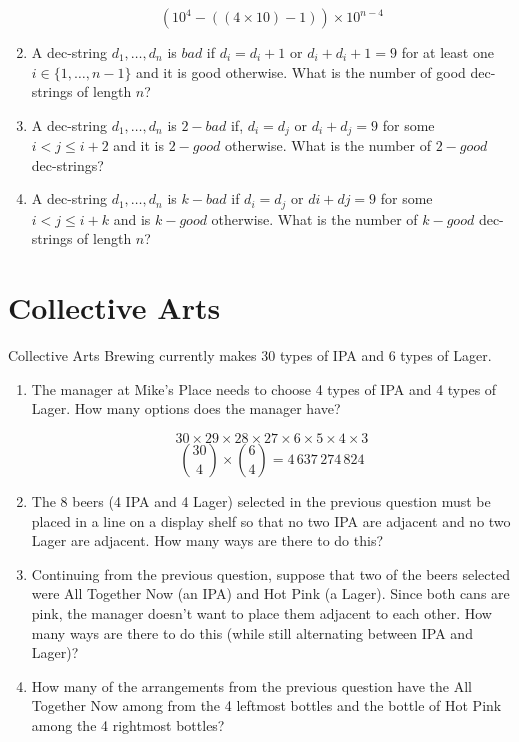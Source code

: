 \documentclass{article}
\begin{document}
\begin{enumerate}
   \[
      (10^4 - ((4 \times 10) - 1)) \times 10^{n-4}
   \] 

   \item A dec-string $d_1,\ldots,d_n$ is $bad$ if $d_i=d_i+1$ or $d_i+d_i+1=9$ for at least one $i\in\{1,\ldots,n-1\}$ and it is good otherwise. What is the number of good dec-strings of length $n$?
   
   \item A dec-string $d_1,\ldots,d_n$ is $2-bad$ if, $d_i=d_j$ or $d_i+d_j=9$ for some $i<j \leq i+2$ and it is $2-good$ otherwise. What is the number of $2-good$ dec-strings?
   
   \item A dec-string $d_1,\ldots,d_n$ is $k-bad$ if $d_i=d_j$ or $di+dj=9$ for some $i<j \leq i+k$ and is $k-good$ otherwise. What is the number of $k-good$ dec-strings of length $n$?

\end{enumerate}

\section{Collective Arts}

Collective Arts Brewing currently makes 30 types of IPA and 6 types of Lager.

\begin{enumerate}

   \item The manager at Mike's Place needs to choose 4 types of IPA and 4 types of Lager. How many options does the manager have?

   \[
     30\times 29\times 28\times 27\times 
     6\times 5\times 4\times 3
   \]
   \[
      \binom{30}{4}\times \binom{6}{4} = 4\,637\,274\,824
   \]
   \item The 8 beers (4 IPA and 4 Lager) selected in the previous question must be placed in a line on a display shelf so that no two IPA are adjacent and no two Lager are adjacent. How many ways are there to do this?

   \item Continuing from the previous question, suppose that two of the beers selected were All Together Now (an IPA) and Hot Pink (a Lager). Since both cans are pink, the manager doesn't want to place them adjacent to each other. How many ways are there to do this (while still alternating between IPA and Lager)?
   
   \item How many of the arrangements from the previous question have the All Together Now among from the 4 leftmost bottles and the bottle of Hot Pink among the 4 rightmost bottles?

\end{enumerate}
\end{document}
